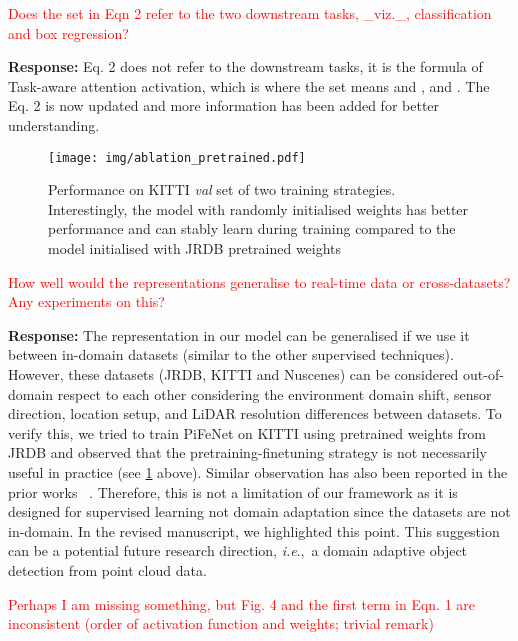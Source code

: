 \documentclass[11pt]{article}
\def\ie{\emph{i.e}.,~} \def\Ie{\emph{I.e}.,~}
\begin{document}
\textcolor{red}{Does the set  in Eqn 2 refer to the two downstream tasks,
\_viz.\_, classification and box regression?} 

\textbf{Response:} Eq. 2 does not refer to the downstream tasks, it is the formula of Task-aware attention activation, which is  where the set  means  and ,  and . The Eq. 2 is now updated and more information has been added for better understanding.

\begin{figure}[!h]
\begin{center}
\texttt{[image: img/ablation\_pretrained.pdf]}
\end{center}
\vspace{-1em}
   \caption{Performance on KITTI \textit{val} set of two training strategies. Interestingly, the model with randomly initialised weights has better performance and can stably learn during training compared to the model initialised with JRDB pretrained weights}
\label{fig:ablation_pretrained}
\end{figure}
\textcolor{red}{How well would the representations generalise to real-time data or
cross-datasets? Any experiments on this?} 

\textbf{Response:} The representation in our model can be generalised if we use it between in-domain datasets (similar to the other supervised techniques). However, these datasets (JRDB, KITTI and Nuscenes) can be considered out-of-domain respect to each other considering the environment domain shift, sensor direction, location setup, and LiDAR resolution differences between datasets. To verify this, we tried to train PiFeNet on KITTI using pretrained weights from JRDB and observed that the pretraining-finetuning strategy is not necessarily useful in practice (see \cref{fig:ablation_pretrained} above).  Similar observation has also been reported in the prior works \eg~\cite{jia2022domain}. Therefore, this is not a limitation of our framework as it is designed for supervised learning not domain adaptation since the datasets are not in-domain.
In the revised manuscript, we highlighted this point. This suggestion can be a potential future research direction, \ie a domain adaptive object detection from point cloud data. 

\textcolor{red}{Perhaps I am missing something, but Fig. 4 and the first term in Eqn. 1
are inconsistent (order of activation function and weights; trivial
remark)} 
\end{document}

